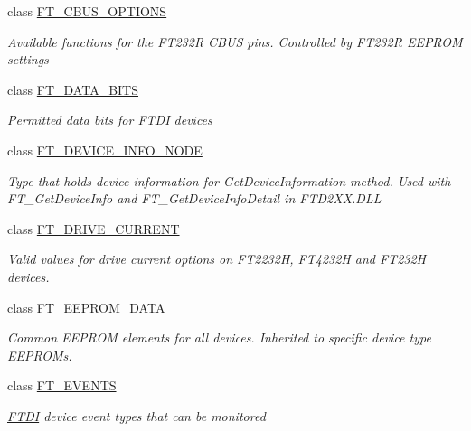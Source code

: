 \begin{DoxyCompactItemize}
class \mbox{\hyperlink{class_f_t_d2_x_x___n_e_t_1_1_f_t_d_i_1_1_f_t___c_b_u_s___o_p_t_i_o_n_s}{F\+T\+\_\+\+C\+B\+U\+S\+\_\+\+O\+P\+T\+I\+O\+NS}}
\begin{DoxyCompactList}\small\item\em Available functions for the F\+T232R C\+B\+US pins. Controlled by F\+T232R E\+E\+P\+R\+OM settings \end{DoxyCompactList}\item 
class \mbox{\hyperlink{class_f_t_d2_x_x___n_e_t_1_1_f_t_d_i_1_1_f_t___d_a_t_a___b_i_t_s}{F\+T\+\_\+\+D\+A\+T\+A\+\_\+\+B\+I\+TS}}
\begin{DoxyCompactList}\small\item\em Permitted data bits for \mbox{\hyperlink{class_f_t_d2_x_x___n_e_t_1_1_f_t_d_i}{F\+T\+DI}} devices \end{DoxyCompactList}\item 
class \mbox{\hyperlink{class_f_t_d2_x_x___n_e_t_1_1_f_t_d_i_1_1_f_t___d_e_v_i_c_e___i_n_f_o___n_o_d_e}{F\+T\+\_\+\+D\+E\+V\+I\+C\+E\+\_\+\+I\+N\+F\+O\+\_\+\+N\+O\+DE}}
\begin{DoxyCompactList}\small\item\em Type that holds device information for Get\+Device\+Information method. Used with F\+T\+\_\+\+Get\+Device\+Info and F\+T\+\_\+\+Get\+Device\+Info\+Detail in F\+T\+D2\+X\+X.\+D\+LL \end{DoxyCompactList}\item 
class \mbox{\hyperlink{class_f_t_d2_x_x___n_e_t_1_1_f_t_d_i_1_1_f_t___d_r_i_v_e___c_u_r_r_e_n_t}{F\+T\+\_\+\+D\+R\+I\+V\+E\+\_\+\+C\+U\+R\+R\+E\+NT}}
\begin{DoxyCompactList}\small\item\em Valid values for drive current options on F\+T2232H, F\+T4232H and F\+T232H devices. \end{DoxyCompactList}\item 
class \mbox{\hyperlink{class_f_t_d2_x_x___n_e_t_1_1_f_t_d_i_1_1_f_t___e_e_p_r_o_m___d_a_t_a}{F\+T\+\_\+\+E\+E\+P\+R\+O\+M\+\_\+\+D\+A\+TA}}
\begin{DoxyCompactList}\small\item\em Common E\+E\+P\+R\+OM elements for all devices. Inherited to specific device type E\+E\+P\+R\+O\+Ms. \end{DoxyCompactList}\item 
class \mbox{\hyperlink{class_f_t_d2_x_x___n_e_t_1_1_f_t_d_i_1_1_f_t___e_v_e_n_t_s}{F\+T\+\_\+\+E\+V\+E\+N\+TS}}
\begin{DoxyCompactList}\small\item\em \mbox{\hyperlink{class_f_t_d2_x_x___n_e_t_1_1_f_t_d_i}{F\+T\+DI}} device event types that can be monitored \end{DoxyCompactList}\item 

\end{DoxyCompactItemize}

